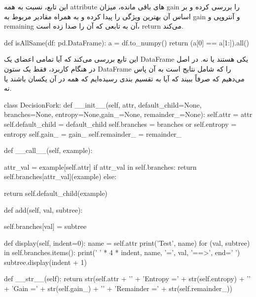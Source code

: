 \documentclass[12pt,titlepage,a4page , tikz , multi,table , svgnames,xcdraw]{article}
\begin{document}
این تابع، نسبت به همه attribute های باقی مانده، میزان gain را بررسی کرده و بر اساس آن بهترین ویژگی را پیدا کرده و به همراه مقادیر مربوط به gain و آنتروپی و remaining آن به تابعی که آن را صدا زده است، return می‌کند.



    
    \begin{latin}
\begin{python}[language=Python]
def isAllSame(df: pd.DataFrame):
    a = df.to_numpy()
    return (a[0] == a[1:]).all()
\end{python}

\end{latin}

این تابع بررسی می‌کند که آیا تمامی اعضای یک DataFrame یکی هستند یا نه. در اصل در هنگام کاربرد، فقط یک ستون DataFrame را که شامل نتایج است به آن پاس می‌دهیم که صرفاً ببیند که آیا به تقسیم بندی رسیده‌ایم که همه در آن یکسان باشند یا نه.

\newpage



    \begin{latin}
\begin{python}[language=Python]
class DecisionFork:
    def __init__(self, attr, default_child=None, branches=None,
     entropy=None,gain_=None, remainder_=None):
        self.attr = attr
        self.default_child = default_child
        self.branches = branches or {}
        self.entropy = entropy
        self.gain_ = gain_
        self.remainder_ = remainder_

    def __call__(self, example):

        attr_val = example[self.attr]
        if attr_val in self.branches:
            return self.branches[attr_val](example)
        else:

            return self.default_child(example)

    def add(self, val, subtree):

        self.branches[val] = subtree

    def display(self, indent=0):
        name = self.attr
        print('Test', name)
        for (val, subtree) in self.branches.items():
            print(' ' * 4 * indent, name, '=', val, '==>',
             end=' ')
            subtree.display(indent + 1)

    def __str__(self):
        return str(self.attr + '\n' + 'Entropy =' + str(self.entropy)
         + '\n' + 'Gain =' +
                   str(self.gain_) + '\n' +
                    'Remainder =' + str(self.remainder_))
\end{python}

\end{latin}
\end{document}
